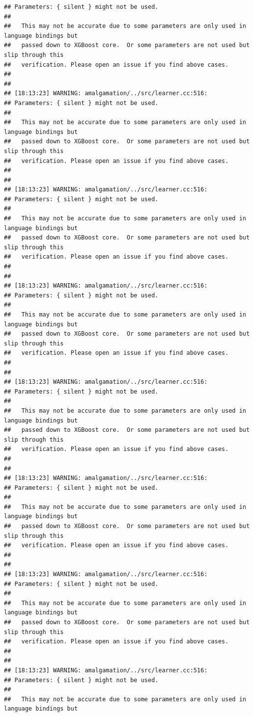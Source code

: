 \documentclass[AMS,STIX2COL]{WileyNJD-v2}\usepackage[]{graphicx}\usepackage[]{color}
\makeatletter
\newenvironment{kframe}{%
 \def\at@end@of@kframe{}%
 \ifinner\ifhmode%
  \def\at@end@of@kframe{\end{minipage}}%
  \begin{minipage}{\columnwidth}%
 \fi\fi%
 \def\FrameCommand##1{\hskip\@totalleftmargin \hskip-\fboxsep
 \colorbox{shadecolor}{##1}\hskip-\fboxsep
     \hskip-\linewidth \hskip-\@totalleftmargin \hskip\columnwidth}%
 \MakeFramed {\advance\hsize-\width
   \@totalleftmargin\z@ \linewidth\hsize
   \@setminipage}}%
 {\par\unskip\endMakeFramed%
 \at@end@of@kframe}
\newenvironment{knitrout}{}{} %
\makeatother
\begin{document}
\begin{knitrout}
\begin{kframe}
\begin{verbatim}
## Parameters: { silent } might not be used.
## 
##   This may not be accurate due to some parameters are only used in language bindings but
##   passed down to XGBoost core.  Or some parameters are not used but slip through this
##   verification. Please open an issue if you find above cases.
## 
## 
## [18:13:23] WARNING: amalgamation/../src/learner.cc:516: 
## Parameters: { silent } might not be used.
## 
##   This may not be accurate due to some parameters are only used in language bindings but
##   passed down to XGBoost core.  Or some parameters are not used but slip through this
##   verification. Please open an issue if you find above cases.
## 
## 
## [18:13:23] WARNING: amalgamation/../src/learner.cc:516: 
## Parameters: { silent } might not be used.
## 
##   This may not be accurate due to some parameters are only used in language bindings but
##   passed down to XGBoost core.  Or some parameters are not used but slip through this
##   verification. Please open an issue if you find above cases.
## 
## 
## [18:13:23] WARNING: amalgamation/../src/learner.cc:516: 
## Parameters: { silent } might not be used.
## 
##   This may not be accurate due to some parameters are only used in language bindings but
##   passed down to XGBoost core.  Or some parameters are not used but slip through this
##   verification. Please open an issue if you find above cases.
## 
## 
## [18:13:23] WARNING: amalgamation/../src/learner.cc:516: 
## Parameters: { silent } might not be used.
## 
##   This may not be accurate due to some parameters are only used in language bindings but
##   passed down to XGBoost core.  Or some parameters are not used but slip through this
##   verification. Please open an issue if you find above cases.
## 
## 
## [18:13:23] WARNING: amalgamation/../src/learner.cc:516: 
## Parameters: { silent } might not be used.
## 
##   This may not be accurate due to some parameters are only used in language bindings but
##   passed down to XGBoost core.  Or some parameters are not used but slip through this
##   verification. Please open an issue if you find above cases.
## 
## 
## [18:13:23] WARNING: amalgamation/../src/learner.cc:516: 
## Parameters: { silent } might not be used.
## 
##   This may not be accurate due to some parameters are only used in language bindings but
##   passed down to XGBoost core.  Or some parameters are not used but slip through this
##   verification. Please open an issue if you find above cases.
## 
## 
## [18:13:23] WARNING: amalgamation/../src/learner.cc:516: 
## Parameters: { silent } might not be used.
## 
##   This may not be accurate due to some parameters are only used in language bindings but

\end{verbatim}
\end{kframe}
\end{knitrout}
\end{document}
